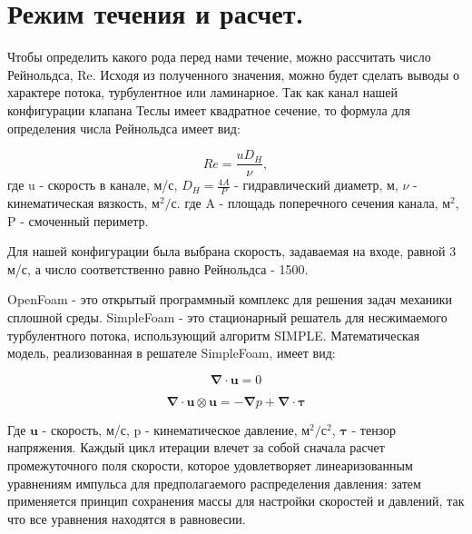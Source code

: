 \documentclass[10pt,a4paper]{book}
\begin{document}
    \section*{Режим течения и расчет.}        
        
        Чтобы определить какого рода перед нами течение, можно рассчитать число Рейнольдса, Re. Исходя из полученного значения, можно будет сделать выводы о характере потока, турбулентное или ламинарное.
        Так как канал нашей конфигурации клапана Теслы имеет квадратное сечение, то формула для определения числа Рейнольдса имеет вид:
        
        \begin{equation}\label{eqn:Re}
            Re = \frac{u D_{H}}{\nu},
        \end{equation}            
        где  u - скорость в канале, м/с, $ D_{H} = \frac{4A}{P} $ - гидравлический диаметр, м, $\nu$ - кинематическая вязкость, м$^{2}/$с. 
        где A - площадь поперечного сечения канала, м$^{2}$, P - смоченный периметр. 
        
        Для нашей конфигурации была выбрана скорость, задаваемая на входе, равной 3 м/с, а число соответственно равно Рейнольдса - 1500.
        
        OpenFoam - это открытый программный комплекс для решения задач механики сплошной среды. SimpleFoam - это стационарный решатель для несжимаемого турбулентного потока, использующий алгоритм SIMPLE. Математическая модель, реализованная в решателе SimpleFoam, имеет вид:
        
        \begin{equation}\label{eqn:simpleFoam}
            \bm{\nabla} \cdot \bm{u} = 0
        \end{equation} 
        
        \begin{equation}\label{eqn:simpleFoam2}
            \bm{\nabla} \cdot \bm{u} \otimes \bm{u} = -\bm{\nabla} p + \bm{\nabla} \cdot \bm{\tau}
        \end{equation} 
        
        Где $\bm{u}$ - скорость, м/с, p - кинематическое давление, м$^{2}/$с$^{2}$, $\bm{\tau}$ - тензор напряжения. 
        Каждый цикл итерации влечет за собой сначала расчет промежуточного поля скорости, которое удовлетворяет линеаризованным уравнениям импульса для предполагаемого распределения давления: затем применяется принцип сохранения массы для настройки скоростей и давлений, так что все уравнения находятся в равновесии.
        
\end{document}
